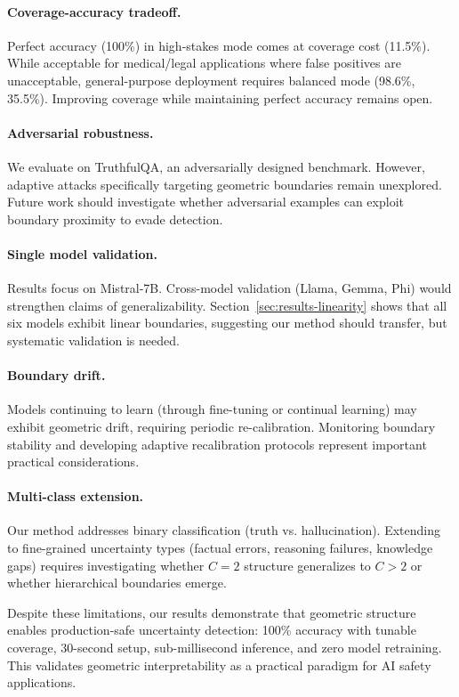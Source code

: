 \documentclass[11pt]{article}
\begin{document}
\paragraph{Coverage-accuracy tradeoff.} Perfect accuracy (100\%) in high-stakes mode comes at coverage cost (11.5\%). While acceptable for medical/legal applications where false positives are unacceptable, general-purpose deployment requires balanced mode (98.6\%, 35.5\%). Improving coverage while maintaining perfect accuracy remains open.

\paragraph{Adversarial robustness.} We evaluate on TruthfulQA, an adversarially designed benchmark. However, adaptive attacks specifically targeting geometric boundaries remain unexplored. Future work should investigate whether adversarial examples can exploit boundary proximity to evade detection.

\paragraph{Single model validation.} Results focus on Mistral-7B. Cross-model validation (Llama, Gemma, Phi) would strengthen claims of generalizability. Section~\ref{sec:results-linearity} shows that all six models exhibit linear boundaries, suggesting our method should transfer, but systematic validation is needed.

\paragraph{Boundary drift.} Models continuing to learn (through fine-tuning or continual learning) may exhibit geometric drift, requiring periodic re-calibration. Monitoring boundary stability and developing adaptive recalibration protocols represent important practical considerations.

\paragraph{Multi-class extension.} Our method addresses binary classification (truth vs. hallucination). Extending to fine-grained uncertainty types (factual errors, reasoning failures, knowledge gaps) requires investigating whether $C=2$ structure generalizes to $C>2$ or whether hierarchical boundaries emerge.

Despite these limitations, our results demonstrate that geometric structure enables production-safe uncertainty detection: 100\% accuracy with tunable coverage, 30-second setup, sub-millisecond inference, and zero model retraining. This validates geometric interpretability as a practical paradigm for AI safety applications.
\end{document}
